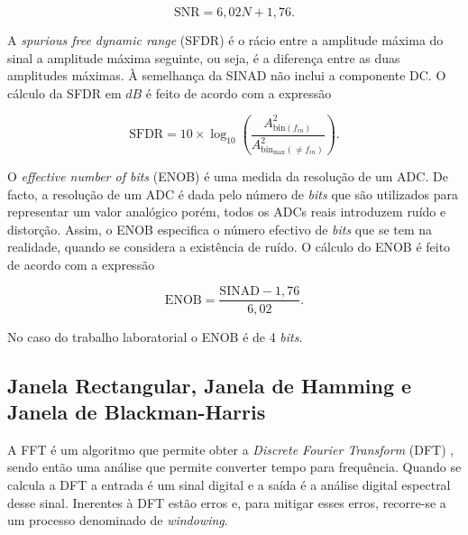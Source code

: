 \documentclass[11pt]{article}
\numberwithin{equation}{section}
\begin{document}
\vspace{-3mm}
\begin{equation}
\text{SNR} = 6,02N + 1,76.
\label{eq:SNR}
\end{equation}

\vspace{1mm}
A \textit{spurious free dynamic range} (SFDR) é o rácio entre a amplitude máxima do sinal a amplitude máxima seguinte, ou seja, é a diferença entre as duas amplitudes máximas. À semelhança da SINAD não inclui a componente DC. O cálculo da SFDR em $dB$ é feito de acordo com a expressão

\vspace{-3mm}
\begin{equation}
\text{SFDR} = 10\times \log_{10} \left(\frac{A^{2}_{\text{bin}(f_{in})}}{A^{2}_{\text{bin}_{\text{max}}(\neq f_{in})}}\right).
\label{eq:SFDR}
\end{equation}

\vspace{1mm}
O \textit{effective number of bits} (ENOB) é uma medida da resolução de um ADC. De facto, a resolução de um ADC é dada pelo número de \textit{bits} que são utilizados para representar um valor analógico porém, todos os ADCs reais introduzem ruído e distorção. Assim, o ENOB especifica o número efectivo de \textit{bits} que se tem na realidade, quando se considera a existência de ruído. O cálculo do ENOB é feito de acordo com a expressão

\vspace{-3mm}
\begin{equation}
\text{ENOB} = \frac{\text{SINAD}-1,76}{6,02}.
\label{eq:ENOB}
\end{equation}

\vspace{1mm}
No caso do trabalho laboratorial o ENOB é de 4 \textit{bits}.

\subsection{Janela Rectangular, Janela de Hamming e Janela de Blackman-Harris}

A FFT é um algoritmo que permite obter a \textit{Discrete Fourier Transform} (DFT) , sendo então uma análise que permite converter tempo para frequência. Quando se calcula a DFT a entrada é um sinal digital e a saída é a análise digital espectral desse sinal. Inerentes à DFT estão erros e, para mitigar esses erros, recorre-se a um processo denominado de \textit{windowing}.
\end{document}
